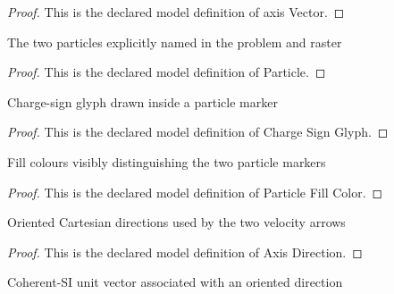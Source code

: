 \begin{proof}
  This is the declared model definition of axis Vector.
\end{proof}
\begin{definition}[Particle]
  \label{def:physics:phyx-mini-0959:phyxminiproblems-problemphyxmini0959-particle}
  The two particles explicitly named in the problem and raster
\end{definition}
\begin{proof}
  This is the declared model definition of Particle.
\end{proof}
\begin{definition}
  \label{def:physics:phyx-mini-0959:phyxminiproblems-problemphyxmini0959-chargesignglyph}
  Charge-sign glyph drawn inside a particle marker
\end{definition}
\begin{proof}
  This is the declared model definition of Charge Sign Glyph.
\end{proof}
\begin{definition}
  \label{def:physics:phyx-mini-0959:phyxminiproblems-problemphyxmini0959-particlefillcolor}
  Fill colours visibly distinguishing the two particle markers
\end{definition}
\begin{proof}
  This is the declared model definition of Particle Fill Color.
\end{proof}
\begin{definition}
  \label{def:physics:phyx-mini-0959:phyxminiproblems-problemphyxmini0959-axisdirection}
  Oriented Cartesian directions used by the two velocity arrows
\end{definition}
\begin{proof}
  This is the declared model definition of Axis Direction.
\end{proof}
\begin{definition}
  \label{def:physics:phyx-mini-0959:phyxminiproblems-problemphyxmini0959-directionvector}
  Coherent-SI unit vector associated with an oriented direction
\end{definition}
